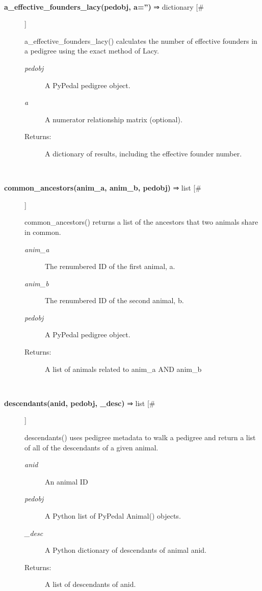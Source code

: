 \documentclass[10pt]{article}
\begin{document}
\begin{description}
\begin{description}
\end{description}
\\ 

\item[\textbf{a\_effective\_founders\_lacy(pedobj, a='')}
 ⇒ dictionary [\#]]

 a\_effective\_founders\_lacy() calculates the number of effective founders in a pedigree using the exact method of Lacy.
\begin{description}
\item[\emph{pedobj}
] A PyPedal pedigree object.
\item[\emph{a}
] A numerator relationship matrix (optional).
\item[Returns:] A dictionary of results, including the effective founder number.

\end{description}
\\ 

\item[\textbf{common\_ancestors(anim\_a, anim\_b, pedobj)}
 ⇒ list [\#]]

 common\_ancestors() returns a list of the ancestors that two animals share in common.
\begin{description}
\item[\emph{anim\_a}
] The renumbered ID of the first animal, a.
\item[\emph{anim\_b}
] The renumbered ID of the second animal, b.
\item[\emph{pedobj}
] A PyPedal pedigree object.
\item[Returns:] A list of animals related to anim\_a AND anim\_b

\end{description}
\\ 

\item[\textbf{descendants(anid, pedobj, \_desc)}
 ⇒ list [\#]]

 descendants() uses pedigree metadata to walk a pedigree and return a list of all of the descendants of a given animal.
\begin{description}
\item[\emph{anid}
] An animal ID
\item[\emph{pedobj}
] A Python list of PyPedal Animal() objects.
\item[\emph{\_desc}
] A Python dictionary of descendants of animal anid.
\item[Returns:] A list of descendants of anid.


\end{description}
\end{description}
\end{document}
